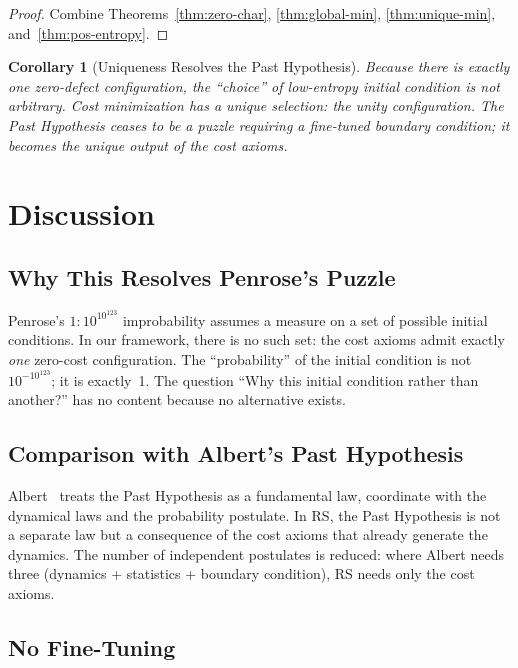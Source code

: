 \documentclass[12pt,a4paper]{article}
\newtheorem{corollary}[theorem]{Corollary}
\theoremstyle{definition}
\theoremstyle{remark}
\begin{document}
\begin{proof}
Combine Theorems~\ref{thm:zero-char}, \ref{thm:global-min},
\ref{thm:unique-min}, and~\ref{thm:pos-entropy}.
\end{proof}

\begin{corollary}[Uniqueness Resolves the Past Hypothesis]
\label{cor:past-hyp}
Because there is exactly one zero-defect configuration, the ``choice''
of low-entropy initial condition is not arbitrary.  Cost minimization
has a unique selection: the unity configuration.  The Past Hypothesis
ceases to be a puzzle requiring a fine-tuned boundary condition; it
becomes the unique output of the cost axioms.
\end{corollary}

\section{Discussion}
\label{sec:discuss}

\subsection{Why This Resolves Penrose's Puzzle}

Penrose's $1:10^{10^{123}}$ improbability assumes a measure on a set of
possible initial conditions.  In our framework, there is no such set: the
cost axioms admit exactly \emph{one} zero-cost configuration.  The
``probability'' of the initial condition is not $10^{-10^{123}}$; it is
exactly~1.  The question ``Why this initial condition rather than another?''
has no content because no alternative exists.

\subsection{Comparison with Albert's Past Hypothesis}

Albert~\cite{Albert2000} treats the Past Hypothesis as a fundamental law,
coordinate with the dynamical laws and the probability postulate.  In RS,
the Past Hypothesis is not a separate law but a consequence of the cost
axioms that already generate the dynamics.  The number of independent
postulates is reduced: where Albert needs three (dynamics + statistics +
boundary condition), RS needs only the cost axioms.

\subsection{No Fine-Tuning}
\end{document}
